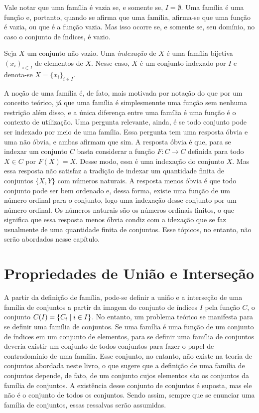 Vale notar que uma família é vazia se, e somente se, $I=\emptyset$. Uma família é uma função e, portanto, quando se afirma que uma família, afirma-se que uma função é vazia, ou que é a função vazia. Mas isso ocorre se, e somente se, seu domínio, no caso o conjunto de índices, é vazio.

\begin{defi}
	Seja $X$ um conjunto não vazio. Uma \emph{indexação} de $X$ é uma família bijetiva $(x_i)_{i \in I}$ de elementos de $X$. Nesse caso, $X$ é um conjunto indexado por $I$ e denota-se $X=\{x_i\}_{i \in I}$.
\end{defi}

A noção de uma família é, de fato, mais motivada por notação do que por um conceito teórico, já que uma família é simplesmennte uma função sem nenhuma restrição além disso, e a única diferença entre uma família é uma função é o contexto de utilização. Uma pergunta relevante, ainda, é se todo conjunto pode ser indexado por meio de uma família. Essa pergunta tem uma resposta óbvia e uma não óbvia, e ambas afirmam que sim. A resposta óbvia é que, para se indexar um conjunto $C$ basta considerar a função $F: C \to C$ definida para todo $X \in C$ por $F(X)=X$. Desse modo, essa é uma indexação do conjunto $X$. Mas essa resposta não satisfaz a tradição de indexar um quantidade finita de conjuntos $\{X,Y\}$ com números naturais. A resposta menos óbvia é que todo conjunto pode ser bem ordenado e, dessa forma, existe uma função de um número ordinal para o conjunto, logo uma indexação desse conjunto por um número ordinal. Os números naturais são os números ordinais finitos, o que significa que essa resposta menos óbvia condiz com a idexação que se faz usualmente de uma quantidade finita de conjuntos. Esse tópicos, no entanto, não serão abordados nesse capítulo.

\section{Propriedades de União e Interseção}

A partir da definição de família, pode-se definir a união e a interseção de uma família de conjuntos a partir da imagem do conjunto de índices $I$ pela função $C$, o conjunto $C(I) = \left\{C_i \;\middle\vert\; i \in I \right\}$. No entanto, um problema teórico se manifesta para se definir uma família de conjuntos. Se uma família é uma função de um conjunto de índices em um conjunto de elementos, para se definir uma família de conjuntos deveria existir um conjunto de todos conjuntos para fazer o papel de contradomínio de uma família. Esse conjunto, no entanto, não existe na teoria de conjuntos abordada neste livro, o que sugere que a definição de uma família de conjuntos depende, de fato, de um conjunto cujos elementos são os conjuntos da família de conjuntos. A existência desse conjunto de conjuntos é suposta, mas ele não é o conjunto de todos os conjuntos. Sendo assim, sempre que se enunciar uma família de conjuntos, essas ressalvas serão assumidas.


